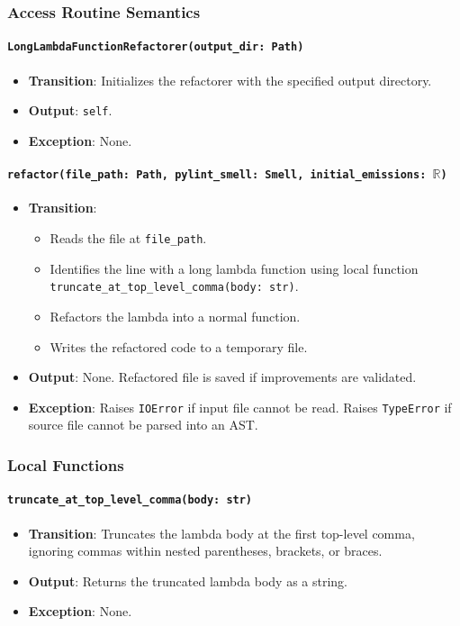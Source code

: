 \documentclass[12pt, titlepage]{article}
\begin{document}
\subsubsection{Access Routine Semantics}

\paragraph{\texttt{LongLambdaFunctionRefactorer(output\_dir: Path)}}
\begin{itemize}
\item \textbf{Transition}: Initializes the refactorer with the specified output directory.
\item \textbf{Output}: \texttt{self}.
\item \textbf{Exception}: None.
\end{itemize}

\paragraph{\texttt{refactor(file\_path: Path, pylint\_smell: Smell, initial\_emissions: $\mathbb{R}$)}}
\begin{itemize}
  \item \textbf{Transition}:
    \begin{itemize}
    \item Reads the file at \texttt{file\_path}.
    \item Identifies the line with a long lambda function using local function \texttt{truncate\_at\_top\_level\_comma(body: str)}.
    \item Refactors the lambda into a normal function.
    \item Writes the refactored code to a temporary file.
    \end{itemize}
  \item \textbf{Output}: None. Refactored file is saved if improvements are validated.
  \item \textbf{Exception}: Raises \texttt{IOError} if input file cannot be read. Raises \texttt{TypeError} if source file cannot be parsed into an AST.
\end{itemize}

\subsubsection{Local Functions}
\paragraph{\texttt{truncate\_at\_top\_level\_comma(body: str)}}
\begin{itemize}
\item \textbf{Transition}: Truncates the lambda body at the first top-level comma, ignoring commas within nested parentheses, brackets, or braces.
\item \textbf{Output}: Returns the truncated lambda body as a string.
\item \textbf{Exception}: None.
\end{itemize}
\end{document}
